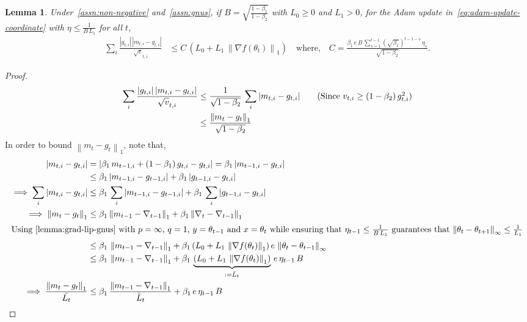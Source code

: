 \documentclass{article}
\newtheorem{lemma}{Lemma}
\newcommand{\ti}[1]{#1_{t,i}}
\newcommand{\tpi}[1]{#1_{t-1,i}}
\newcommand{\norm}[1]{\left\|#1 \right\|}
\newcommand{\tht}{\theta_t}
\newcommand{\thtt}{\theta_{t+1}}
\begin{document}
\begin{lemma}
Under~\cref{assn:non-negative} and~\cref{assn:gnus}, if $B=\sqrt{\frac{1-\beta_1}{1-\beta_2}}$ with $L_0 \geq 0$ and $L_1 > 0$, for the Adam update in~\cref{eq:adam-update-coordinate} with $\eta \leq \frac{1}{B \, L_1}$ for all $t$,
\begin{align*}
\sum_i \frac{|\ti{g}| \, |\ti{m} - \ti{g}|}{\ti{\sqrt{v}}} &\leq C \, (L_0 + L_1 \, \norm{\nabla f(\tht)}_1) \quad \text{where,} \quad C = \frac{\beta_1\,e \, B \, \sum_{s = 1}^{t-1} (\sqrt{\beta_1})^{t-1-s} \, \eta_{s}}{\sqrt{1 - \beta_2}}. 
\end{align*}
\label{lemma:adam-mom-bound-gnus}
\end{lemma}
\begin{proof}
\begin{align}
\sum_i \frac{|\ti{g}| \, |\ti{m} - \ti{g}|}{\ti{\sqrt{v}}} &\leq \frac{1}{\sqrt{1 - \beta_2}} \, \sum_i |\ti{m} - \ti{g}| \tag{Since $\ti{v} \geq (1 - \beta_2) \, \ti{g^2}$} \\
& \leq \frac{\norm{m_t - g_t}_1}{\sqrt{1 - \beta_2}} \label{eq:adam-1pl-mom-recursion-1-gnus}
\end{align}
In order to bound $\norm{m_t - g_t}_1$, note that, 
\begin{align}
|\ti{m} - \ti{g}| &= |\beta_1 \, \tpi{m} + (1-\beta_1) \, \ti{g} - \ti{g}| = \beta_1 \, |\tpi{m} - \ti{g}| \\
& \leq \beta_1 \, |\tpi{m} - \tpi{g}| + \beta_1 \, |\tpi{g} - \ti{g}| \nonumber \\
\implies \sum_i |\ti{m} - \ti{g}| & \leq \beta_1 \, \sum_i |\tpi{m} - \tpi{g}| + \beta_1 \, \sum_i |\tpi{g} - \ti{g}| \nonumber \\
\implies \norm{m_t - g_t}_1 & \leq \beta_1 \norm{m_{t-1}  - \nabla_{t-1}}_1 + \beta_1 \norm{\nabla_t - \nabla_{t-1}}_1 \nonumber \\
\intertext{Using~\cref{lemma:grad-lip-gnus} with $p = \infty$, $q = 1$, $y = \theta_{t-1}$ and $x = \theta_t$ while ensuring that $\eta_{t-1} \leq \frac{1}{B \, L_1}$ guarantees that $\norm{\tht - \thtt}_\infty \leq \frac{1}{L_1}$} 
& \leq \beta_1 \, \norm{m_{t-1}  - \nabla_{t-1}}_1 + \beta_1 \, (L_0 + L_1 \, \norm{\nabla f(\tht)}_1) \, e \, \norm{\tht - \theta_{t-1}}_{\infty} \nonumber \\
& \leq \beta_1 \, \norm{m_{t-1}  - \nabla_{t-1}}_{1} + \beta_1 \, \underbrace{(L_0 + L_1 \, \norm{\nabla f(\tht)}_1)}_{:= \bar{L}_t} \, e \, \eta_{t-1} \, B \nonumber \\
\implies \frac{\norm{m_t - g_t}_1}{\bar{L_t}} & \leq \beta_1 \, \frac{\norm{m_{t-1}  - \nabla_{t-1}}_{1}}{\bar{L}_t} +\beta_1\, e \, \eta_{t-1} \, B \label{eq:adam-1pl-mom-recursion-2-gnus}

\end{align}
\end{proof}
\end{document}
